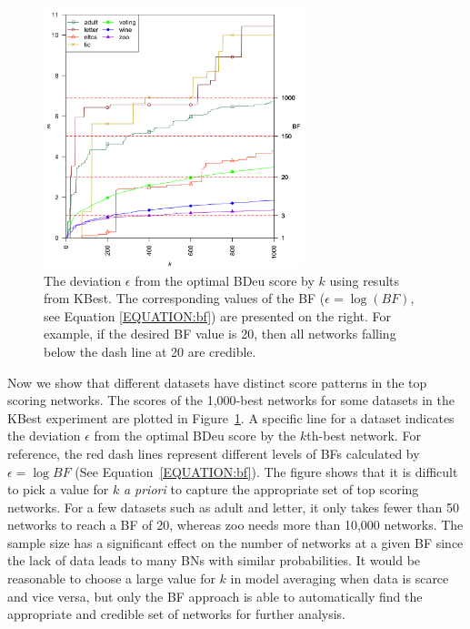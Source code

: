\documentclass[letterpaper]{article}
\begin{document}
\vspace{-0.87mm}
\vspace{-1.47mm}
\begin{figure}[thb]
\centering
\includegraphics[width=\linewidth,height=2.979in ]{plot_diff.png}
\caption{The deviation $\epsilon$ from the optimal BDeu score by $k$ using results from KBest. The corresponding values of the BF ($\epsilon=\log(BF)$, see Equation \ref{EQUATION:bf}) are presented on the right. For example, if the desired BF value is 20, then all networks falling below the dash line at 20 are credible.}\label{fig:diff}
\end{figure}

\vspace{-2.06mm}
Now we show that different datasets have distinct score patterns in the top scoring networks. The scores of the 1,000-best networks for some datasets in the KBest experiment are plotted in Figure~\ref{fig:diff}. A specific line for a dataset indicates the deviation $\epsilon$ from the optimal BDeu score by the $k$th-best network. For reference, the red dash lines represent different levels of BFs calculated by $\epsilon=\log{BF}$ (See Equation~\ref{EQUATION:bf}). The figure shows that it is difficult to pick a value for $k$ \emph{a priori} to capture the appropriate set of top scoring networks. For a few datasets such as adult and letter, it only takes fewer than 50 networks to reach a BF of 20, whereas zoo needs more than 10,000 networks. The sample size has a significant effect on the number of networks at a given BF since the lack of data leads to many BNs with similar probabilities. It would be reasonable to choose a large value for $k$ in model averaging when data is scarce and vice versa, but only the BF approach is able to automatically find the appropriate and credible set of networks for further analysis.
\end{document}
